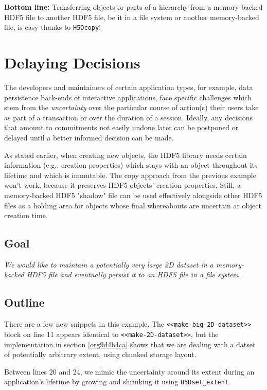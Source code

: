\documentclass[a4paper, 12pt]{article}
\begin{document}
\textbf{\textbf{Bottom line:}} Transferring objects or parts of a hierarchy from a
memory-backed HDF5 file to another HDF5 file, be it in a file system or
another memory-backed file, is easy thanks to \texttt{H5Ocopy}!

\section{Delaying Decisions \label{orgca09e6b}}
\label{sec:orgc03bf5d}

The developers and maintainers of certain application types, for example,
data persistence back-ends of interactive applications, face specific
challenges which stem from the \emph{uncertainty} over the particular course of
action(s) their users take as part of a transaction or over the duration of a
session. Ideally, any decisions that amount to commitments not easily undone
later can be postponed or delayed until a better informed decision can be
made.

As stated earlier, when creating new objects, the HDF5 library needs certain
information (e.g., creation properties) which stays with an object throughout
its lifetime and which is immutable. The copy approach from the previous
example won't work, because it preserves HDF5 objects' creation properties.
Still, a memory-backed HDF5 "shadow" file can be used effectively alongside
other HDF5 files as a holding area for objects whose final whereabouts are
uncertain at object creation time.

\subsection{Goal}
\label{sec:org327831f}

\emph{We would like to maintain a potentially very large 2D dataset in a
memory-backed HDF5 file and eventually persist it to an HDF5 file in a file
system.}

\subsection{Outline}
\label{sec:orgf271b64}

There are a few new snippets in this example. The \texttt{<<make-big-2D-dataset>>}
block on line 11 appears identical to \texttt{<<make-2D-dataset>>}, but the
implementation in section \ref{org9d4b4ca} shows that we are dealing
with a datset of potentially arbitrary extent, using chunked storage layout.

Between lines 20 and 24, we mimic the uncertainty around its
extent during an application's lifetime by growing and shrinking it using
\texttt{H5Dset\_extent}.
\end{document}
